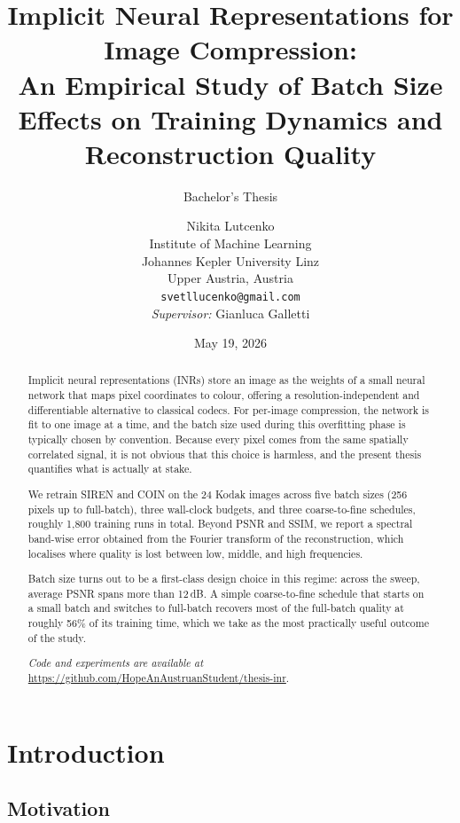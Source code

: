 \documentclass[a4paper,oneside,11pt,english]{scrartcl}
\title{%
    Implicit Neural Representations for Image Compression:\\
    An Empirical Study of Batch Size Effects on Training Dynamics
    and Reconstruction Quality
}
\subtitle{Bachelor's Thesis}
\author{Nikita Lutcenko\\[0.3em]
    \small Institute of Machine Learning\\
    \small Johannes Kepler University Linz\\
    \small Upper Austria, Austria\\
    \small \texttt{svetllucenko@gmail.com}\\[0.8em]
    \small \textit{Supervisor:} Gianluca Galletti
}
\date{May 19, 2026}
\begin{document}
\maketitle

\begin{abstract}
Implicit neural representations (INRs) store an image as the weights of a
small neural network that maps pixel coordinates to colour, offering a
resolution-independent and differentiable alternative to classical codecs.
For per-image compression, the network is fit to one image at a time, and
the batch size used during this overfitting phase is typically chosen by
convention.  Because every pixel comes from the same spatially correlated
signal, it is not obvious that this choice is harmless, and the present
thesis quantifies what is actually at stake.

We retrain SIREN and COIN on the 24 Kodak images across five batch sizes
(256 pixels up to full-batch), three wall-clock budgets, and three
coarse-to-fine schedules, roughly 1{,}800 training runs in total.  Beyond
PSNR and SSIM, we report a spectral band-wise error obtained from the
Fourier transform of the reconstruction, which localises where quality is
lost between low, middle, and high frequencies.

Batch size turns out to be a first-class design choice in this regime:
across the sweep, average PSNR spans more than 12\,dB.  A simple
coarse-to-fine schedule that starts on a small batch and switches to
full-batch recovers most of the full-batch quality at roughly 56\% of its
training time, which we take as the most practically useful outcome of
the study.

\medskip\noindent
\textit{Code and experiments are available at}
\url{https://github.com/HopeAnAustruanStudent/thesis-inr}.
\end{abstract}

\tableofcontents
\bigskip

\section{Introduction}
\label{sec:introduction}

\subsection{Motivation}
\end{document}
